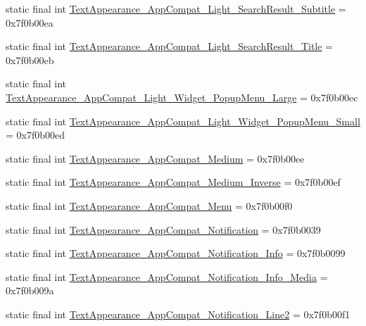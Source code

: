 \begin{CompactItemize}
\item 
static final int \hyperlink{classandroid_1_1support_1_1v7_1_1appcompat_1_1_r_1_1style_f0e0c06dd80517100c7bb7d389922d6f}{TextAppearance\_\-AppCompat\_\-Light\_\-SearchResult\_\-Subtitle} = 0x7f0b00ea
\item 
static final int \hyperlink{classandroid_1_1support_1_1v7_1_1appcompat_1_1_r_1_1style_98b9016b05a9c10ffb4ffded1557b492}{TextAppearance\_\-AppCompat\_\-Light\_\-SearchResult\_\-Title} = 0x7f0b00eb
\item 
static final int \hyperlink{classandroid_1_1support_1_1v7_1_1appcompat_1_1_r_1_1style_614ce1b1a59101c8447914111d6c06dc}{TextAppearance\_\-AppCompat\_\-Light\_\-Widget\_\-PopupMenu\_\-Large} = 0x7f0b00ec
\item 
static final int \hyperlink{classandroid_1_1support_1_1v7_1_1appcompat_1_1_r_1_1style_90349244fa488d297892a8f1d9eb7386}{TextAppearance\_\-AppCompat\_\-Light\_\-Widget\_\-PopupMenu\_\-Small} = 0x7f0b00ed
\item 
static final int \hyperlink{classandroid_1_1support_1_1v7_1_1appcompat_1_1_r_1_1style_5a892303573e43b269f93804bf93695a}{TextAppearance\_\-AppCompat\_\-Medium} = 0x7f0b00ee
\item 
static final int \hyperlink{classandroid_1_1support_1_1v7_1_1appcompat_1_1_r_1_1style_119d850b6fefd0a807774bffc5913a13}{TextAppearance\_\-AppCompat\_\-Medium\_\-Inverse} = 0x7f0b00ef
\item 
static final int \hyperlink{classandroid_1_1support_1_1v7_1_1appcompat_1_1_r_1_1style_a1e6c2be6b6011b1259e0e0d5fe1c0d3}{TextAppearance\_\-AppCompat\_\-Menu} = 0x7f0b00f0
\item 
static final int \hyperlink{classandroid_1_1support_1_1v7_1_1appcompat_1_1_r_1_1style_2952c3fb8d40661fa8310452960df567}{TextAppearance\_\-AppCompat\_\-Notification} = 0x7f0b0039
\item 
static final int \hyperlink{classandroid_1_1support_1_1v7_1_1appcompat_1_1_r_1_1style_1a2f0afd21246a7c5155e616eb3652e1}{TextAppearance\_\-AppCompat\_\-Notification\_\-Info} = 0x7f0b0099
\item 
static final int \hyperlink{classandroid_1_1support_1_1v7_1_1appcompat_1_1_r_1_1style_059c2c4d2519197dc45f13f4f04799b9}{TextAppearance\_\-AppCompat\_\-Notification\_\-Info\_\-Media} = 0x7f0b009a
\item 
static final int \hyperlink{classandroid_1_1support_1_1v7_1_1appcompat_1_1_r_1_1style_2e2bc0ab084f91b3f274b98680104cf6}{TextAppearance\_\-AppCompat\_\-Notification\_\-Line2} = 0x7f0b00f1
\item 

\end{CompactItemize}
